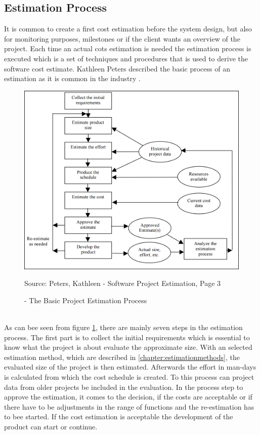\subsection{Estimation Process}

It is common to create a first cost estimation before the system design, but also for monitoring purposes, milestones or if the client wants an overview of the project. Each time an actual cots estimation is needed the estimation process is executed which is a set of techniques and procedures that is used to derive the software cost estimate. Kathleen Peters described the basic process of an estimation as it is common in the industry \cite{estimationProcess}.\\
\begin{figure}[h] 
	\centering 
	\includegraphics[width=13cm]{images/estimationProcess.PNG} 
	\caption{- The Basic Project Estimation Process}
	Source: Peters, Kathleen - Software Project Estimation, Page 3  
	\label{fig:basicEstimationProcess}
\end{figure}\\
As can bee seen from figure \ref{fig:basicEstimationProcess}, there are mainly seven steps in the estimation process. The first part is to collect the initial requirements which is essential to know what the project is about evaluate the approximate size. With an selected estimation method, which are described in \ref{chapter:estimationmethods}, the evaluated size of the project is then estimated. Afterwards the effort in man-days is calculated from which the cost schedule is created. To this process can project data from older projects be included in the evaluation. In the process step to approve the estimation, it comes to the decision, if the costs are acceptable or if there have to be adjustments in the range of functions and the re-estimation has to bee started. If the cost estimation is acceptable the development of the product can start or continue.\\
